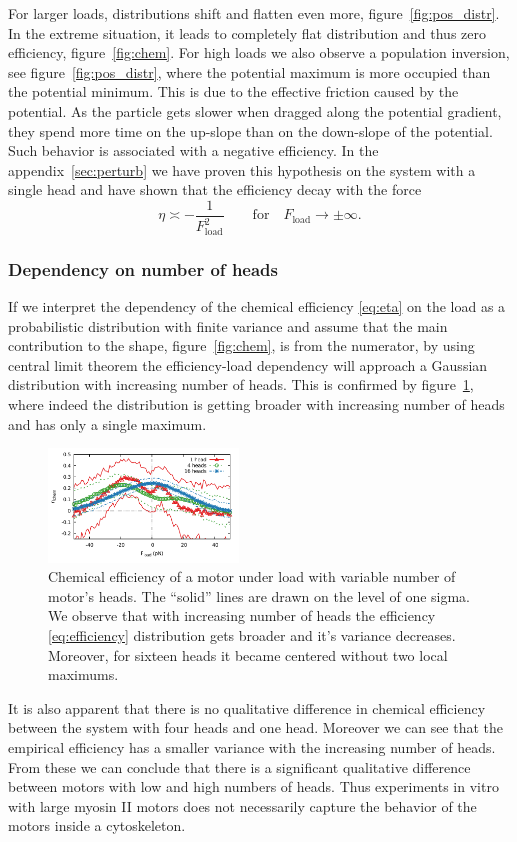 \documentclass[aps,pre,twocolumn,showpacs,showkeys,superscriptaddress,floatfix]{revtex4-1}
\begin{document}
For larger loads, distributions shift and flatten even more, figure~\ref{fig:pos_distr}. 
In the extreme situation, it leads to completely flat distribution and thus zero efficiency, figure~\ref{fig:chem}.
For high loads we also observe a population inversion, see figure~\ref{fig:pos_distr}, 
where the potential maximum is more occupied than the potential minimum. 
This is due to the effective friction caused by the potential. 
As the particle gets slower when dragged along the potential gradient, 
 they spend more time on the up-slope than on the down-slope of the potential.
Such behavior is associated with a negative efficiency. 
In the appendix~\ref{sec:perturb} we have proven this hypothesis on the system with a single head and have shown that the efficiency decay with the force 
\[
\eta \asymp - \frac{1}{ F_\text{load}^2 } \qquad \text{for} \quad F_\text{load} \to \pm \infty .
\]

\subsubsection{Dependency on number of heads}
If we interpret the dependency of the chemical efficiency \eqref{eq:eta} on the load as a probabilistic distribution with finite variance and assume that the main contribution to the shape, figure~\ref{fig:chem}, is from the numerator, 
by using central limit theorem the efficiency-load dependency will approach a Gaussian distribution with increasing number of heads. 
This is confirmed by figure~\ref{fig:chem_eff_1head}, where indeed the distribution is getting broader with increasing number of heads and has only a single maximum.
\begin{figure}[t]
\centering
\includegraphics[width=0.45\textwidth,height=!]{chemical_cycle_1head}
\caption{
\label{fig:chem_eff_1head}
Chemical efficiency of a motor under load with variable number of motor's heads.
The ``solid'' lines are drawn on the level of one sigma. 
We observe that with increasing number of heads the efficiency \eqref{eq:efficiency} distribution gets broader and it's variance decreases.
Moreover, for sixteen heads it became centered without two local maximums.
}
\end{figure}
It is also apparent that there is no qualitative difference in chemical efficiency between the system with four heads and one head.
Moreover we can see that the empirical efficiency has a smaller variance with the increasing number of heads. 
From these we can conclude that there is a significant qualitative difference between motors with low and high numbers of heads. 
Thus experiments in vitro with large myosin II motors \cite{brown2009cross-correlated} does not necessarily capture the behavior of the motors inside a cytoskeleton. 
\end{document}
